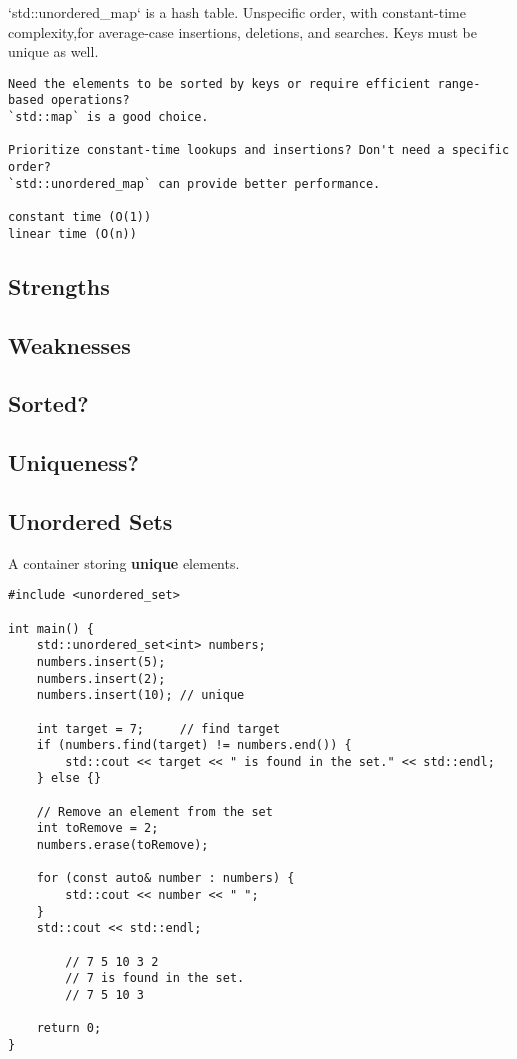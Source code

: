 `std::unordered\_map` is a hash table. 
Unspecific order, with constant-time complexity,for average-case 
insertions, deletions, and searches. 
Keys must be unique as well.

\begin{verbatim}
Need the elements to be sorted by keys or require efficient range-based operations?
`std::map` is a good choice.

Prioritize constant-time lookups and insertions? Don't need a specific order? 
`std::unordered_map` can provide better performance.

constant time (O(1)) 
linear time (O(n))
\end{verbatim}

\subsection{Strengths}
\subsection{Weaknesses}
\subsection{Sorted?}
\subsection{Uniqueness?}

\subsection{Unordered Sets}

A container storing \textbf{unique} elements.

\begin{verbatim}
#include <unordered_set>

int main() {
    std::unordered_set<int> numbers;
    numbers.insert(5);
    numbers.insert(2);
    numbers.insert(10); // unique

    int target = 7;     // find target
    if (numbers.find(target) != numbers.end()) {
        std::cout << target << " is found in the set." << std::endl;
    } else {}

    // Remove an element from the set
    int toRemove = 2;
    numbers.erase(toRemove);

    for (const auto& number : numbers) {
        std::cout << number << " ";
    }
    std::cout << std::endl;

        // 7 5 10 3 2
        // 7 is found in the set.
        // 7 5 10 3

    return 0;
}
\end{verbatim}
